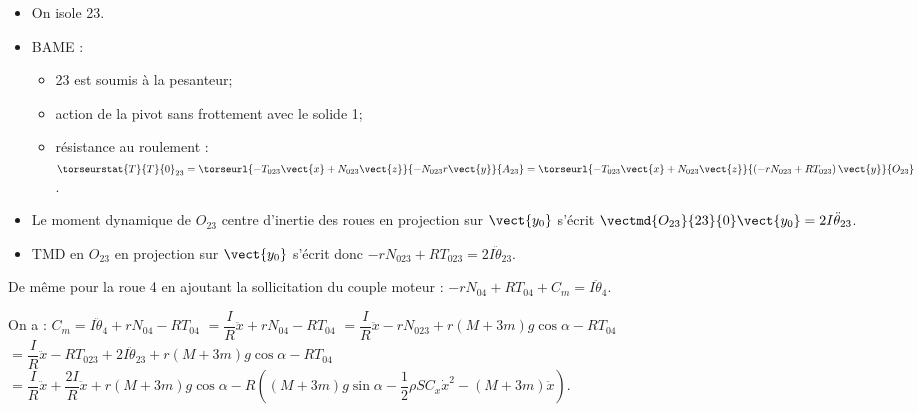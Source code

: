 \begin{multicols}{2}
\ifprof
\begin{corrige}
\begin{itemize}
\item On isole 23. 
\item BAME : 
\begin{itemize}
\item 23 est soumis à la pesanteur;
\item action de la pivot sans frottement avec le solide 1;
\item résistance au roulement : $\torseurstat{T}{T}{0}_{23}=\torseurl{-T_{023}\vect{x}+N_{023}\vect{z}}{-N_{023}r\vect{y}}{A_{23}}=\torseurl{-T_{023}\vect{x}+N_{023}\vect{z}}{\left(-rN_{023}+RT_{023} \right)\vect{y}}{O_{23}}$.
\end{itemize}
\item Le moment dynamique de $O_{23}$ centre d'inertie des roues en projection sur $\vect{y_0}$ s'écrit $\vectmd{O_{23}}{23}{0}\vect{y_0}=2I\ddot{\theta}_{23}$.
\item TMD en $O_{23}$ en projection sur $\vect{y_0}$ s'écrit donc $-rN_{023}+RT_{023}=2I\ddot{\theta}_{23}$.
\end{itemize}
De même pour la roue 4 en ajoutant la sollicitation du couple moteur : 
$-rN_{04}+RT_{04}+C_m=I\ddot{\theta}_{4}$.
\end{corrige}
\else
\fi

\ifprof
\begin{corrige}
On a :
%
%
$C_m=I\ddot{\theta}_{4}+rN_{04}-RT_{04}$ $=\dfrac{I}{R}\ddot{x}+rN_{04}-RT_{04}$
$=\dfrac{I}{R}\ddot{x}-rN_{023}+r\left(M+3m\right)g \cos \alpha -RT_{04}$
$=\dfrac{I}{R}\ddot{x}-RT_{023}+2I\ddot{\theta}_{23}+r\left(M+3m\right)g \cos \alpha -RT_{04}$
$=\dfrac{I}{R}\ddot{x}+\dfrac{2I}{R}\ddot{x}+r\left(M+3m\right)g \cos \alpha -R\left(\left(M+3m\right)g\sin \alpha -\dfrac{1}{2}\rho S C_x \dot{x}^2-\left(M+3m\right)\ddot{x}\right)$. 


\end{corrige}
\end{multicols}

